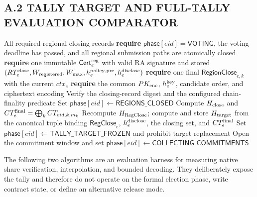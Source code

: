 \documentclass[pdflatex,sn-mathphys-num]{sn-jnl}%
\theoremstyle{thmstyleone}%
\theoremstyle{thmstyletwo}%
\theoremstyle{thmstylethree}%
\begin{document}
\begin{appendices}
\subsection*{A.2 TALLY TARGET AND FULL-TALLY EVALUATION COMPARATOR}

\begin{algorithm}[H]
\caption{$\mathsf{FreezeThresholdTallyTarget}(eid)$}
\label{alg:freeze-threshold-target}
\begin{algorithmic}[1]
\Require All required regional closing records
\State \textbf{require} $\mathsf{phase}[eid]=\mathsf{VOTING}$, the voting deadline has passed, and all regional submission paths are atomically closed
\State \textbf{require} one immutable $\mathsf{Cert}_e^{\rm reg}$ with valid RA signature and stored $(RT_e^{\rm close},W_{\rm registered},W_{\max},h_e^{\rm policy,pre},h_e^{\rm disclose})$
  \State \textbf{require} one final $\mathsf{RegionClose}_{e,k}$ with the current $ctx_e$
  \State \textbf{require} the common $PK_{\rm enc}$, $h_e^{\rm key}$, candidate order, and ciphertext encoding
  \State Verify the closing-record digest and the configured chain-finality predicate
\EndFor
\State Set $\mathsf{phase}[eid]\gets\mathsf{REGIONS\_CLOSED}$
\State Compute $H_{\rm close}$ and $CT_e^{\rm final}=\bigoplus_k CT_{eid,k,m_k}$
\State Recompute $H_{\rm RegClose}$; compute and store $H_{\rm target}$ from the canonical tuple binding $\mathsf{RegClose}_e$, $h_e^{\rm disclose}$, the closing set, and $CT_e^{\rm final}$
\State Set $\mathsf{phase}[eid]\gets\mathsf{TALLY\_TARGET\_FROZEN}$ and prohibit target replacement
\State Open the commitment window and set $\mathsf{phase}[eid]\gets\mathsf{COLLECTING\_COMMITMENTS}$
\end{algorithmic}
\end{algorithm}

The following two algorithms are an evaluation harness for measuring native
share verification, interpolation, and bounded decoding.  They deliberately
expose the tally and therefore do not operate on the formal election phase,
write contract state, or define an alternative release mode.


\end{appendices}
\end{document}
